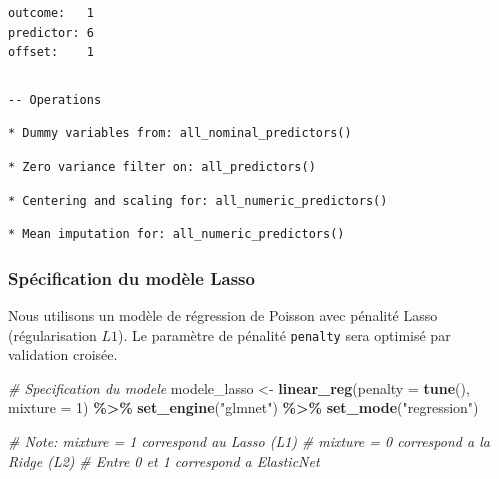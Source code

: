 \documentclass[
  french,
]{book}
\newenvironment{Shaded}{\begin{snugshade}}{\end{snugshade}}
\newcommand{\AttributeTok}[1]{\textcolor[rgb]{0.13,0.29,0.53}{#1}}
\newcommand{\CommentTok}[1]{\textcolor[rgb]{0.56,0.35,0.01}{\textit{#1}}}
\newcommand{\DecValTok}[1]{\textcolor[rgb]{0.00,0.00,0.81}{#1}}
\newcommand{\FunctionTok}[1]{\textcolor[rgb]{0.13,0.29,0.53}{\textbf{#1}}}
\newcommand{\NormalTok}[1]{#1}
\newcommand{\OtherTok}[1]{\textcolor[rgb]{0.56,0.35,0.01}{#1}}
\newcommand{\SpecialCharTok}[1]{\textcolor[rgb]{0.81,0.36,0.00}{\textbf{#1}}}
\newcommand{\StringTok}[1]{\textcolor[rgb]{0.31,0.60,0.02}{#1}}
\theoremstyle{definition}
\theoremstyle{definition}
\theoremstyle{definition}
\theoremstyle{definition}
\theoremstyle{remark}
\begin{document}
\begin{verbatim}
outcome:   1
predictor: 6
offset:    1
\end{verbatim}

\begin{verbatim}
\end{verbatim}

\begin{verbatim}
-- Operations 
\end{verbatim}

\begin{verbatim}
* Dummy variables from: all_nominal_predictors()
\end{verbatim}

\begin{verbatim}
* Zero variance filter on: all_predictors()
\end{verbatim}

\begin{verbatim}
* Centering and scaling for: all_numeric_predictors()
\end{verbatim}

\begin{verbatim}
* Mean imputation for: all_numeric_predictors()
\end{verbatim}

\subsubsection*{Spécification du modèle Lasso}

Nous utilisons un modèle de régression de Poisson avec pénalité Lasso (régularisation \(L1\)). Le paramètre de pénalité \texttt{penalty} sera optimisé par validation croisée.

\begin{Shaded}
\begin{Highlighting}[]
\CommentTok{\# Specification du modele}
\NormalTok{modele\_lasso }\OtherTok{\textless{}{-}} \FunctionTok{linear\_reg}\NormalTok{(}\AttributeTok{penalty =} \FunctionTok{tune}\NormalTok{(), }\AttributeTok{mixture =} \DecValTok{1}\NormalTok{) }\SpecialCharTok{\%\textgreater{}\%}
  \FunctionTok{set\_engine}\NormalTok{(}\StringTok{"glmnet"}\NormalTok{) }\SpecialCharTok{\%\textgreater{}\%}
  \FunctionTok{set\_mode}\NormalTok{(}\StringTok{"regression"}\NormalTok{)}

\CommentTok{\# Note: mixture = 1 correspond au Lasso (L1)}
\CommentTok{\# mixture = 0 correspond a la Ridge (L2)}
\CommentTok{\# Entre 0 et 1 correspond a ElasticNet}
\end{Highlighting}
\end{Shaded}
\end{document}
